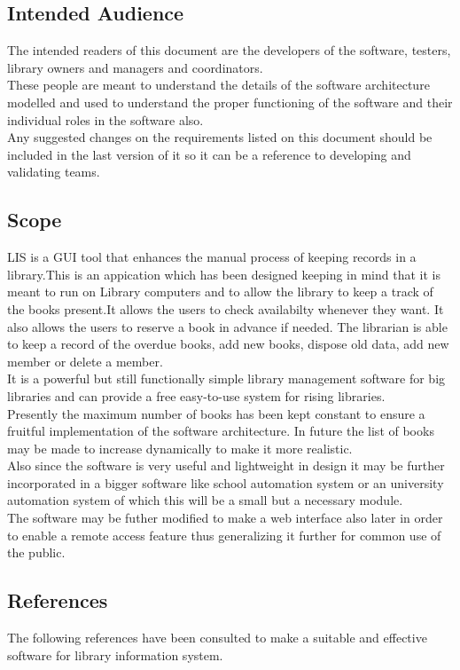 \documentclass{article}
\begin{document}
\subsection{Intended Audience}
The intended readers of this document are the developers of the software, testers, library owners
and managers and coordinators.\\
These people are meant to understand the details of the software architecture modelled and used to understand the proper functioning of the software and their individual roles in the software also.\\
Any suggested changes on the requirements listed on this document should be included in
the last version of it so it can be a reference to developing and validating teams.
\subsection{Scope}
LIS is a GUI tool that enhances the manual process of keeping records in a library.This is an appication which has been designed keeping in mind that it is meant to run on Library computers and to allow the library to keep a track of the books present.It allows the users to check availabilty whenever they want. It also allows the users to reserve a book in advance if needed. The librarian is able to keep a record of the overdue books, add new books, dispose old data, add new member or delete a member. 
\\
It is a powerful but still functionally simple library management software for big libraries and can provide a free easy-to-use system for rising libraries.
\\
Presently the maximum number of books has been kept constant to ensure a fruitful implementation of the software architecture. In future the list of books may be made to increase dynamically to make it more realistic.
\\
Also since the software is very useful and lightweight in design it may be further incorporated in a bigger software like school automation system or an university automation system of which this will be a small but a necessary module.
\\
The software may be futher modified to make a web interface also later in order to enable a remote access feature thus generalizing it further for common use of the public.
\subsection{References}
The following references have been consulted to make a suitable and effective software for library information system.
\end{document}
